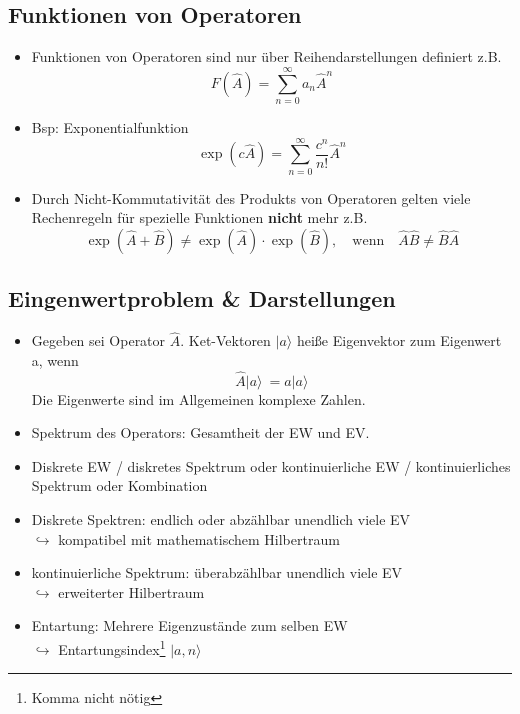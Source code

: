 \documentclass[10pt,article,colorback,accentcolor=tud9d]{scrartcl}
\begin{document}
\subsection{Funktionen von Operatoren}
\begin{itemize}
  \item Funktionen von Operatoren sind nur über Reihendarstellungen definiert z.B.
    \begin{equation}
    F(\hat{A})=\sum^\infty_{n=0}a_n\hat{A}^n
    \end{equation}
  \item Bsp: Exponentialfunktion
    \begin{equation}
    \exp(c\hat{A})= \sum^\infty_{n=0}\frac{c^n}{n!}\hat{A}^n
    \end{equation}
  \item Durch Nicht-Kommutativität des Produkts von Operatoren gelten viele Rechenregeln für spezielle Funktionen \textbf{nicht} mehr z.B.
  \begin{equation}
  \exp(\hat{A}+\hat{B})\neq \exp(\hat{A}) \cdot\exp(\hat{B}), \quad \text{wenn} \quad \hat{A}\hat{B} \neq \hat{B}\hat{A}
  \end{equation}
\end{itemize}
\subsection{Eingenwertproblem \& Darstellungen}
\begin{itemize}
  \item Gegeben sei Operator $\hat{A}$. Ket-Vektoren $|a\rangle $ heiße Eigenvektor zum Eigenwert a, wenn
    \begin{equation}
    \hat{A}|a\rangle  \ = a|a\rangle 
    \end{equation}
    Die Eigenwerte sind im Allgemeinen komplexe Zahlen.
  \item Spektrum des Operators: Gesamtheit der EW und EV.
  \item Diskrete EW / diskretes Spektrum oder kontinuierliche EW / kontinuierliches Spektrum oder Kombination
  \item Diskrete Spektren: endlich oder abzählbar unendlich viele EV\\
    $\hookrightarrow$ kompatibel mit mathematischem Hilbertraum
  \item kontinuierliche Spektrum: überabzählbar unendlich viele EV\\
    $\hookrightarrow$ erweiterter Hilbertraum
  \item Entartung: Mehrere Eigenzustände zum selben EW\\
    $\hookrightarrow$ Entartungsindex\footnote{Komma nicht nötig} $|a,n\rangle $
\end{itemize}
\end{document}
